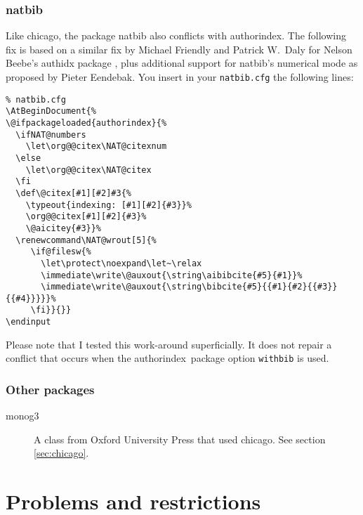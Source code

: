 \documentclass[a4paper]{article}
\newcommand{\package}[1]{\textsf{#1}}
\newcommand{\authorindex}{\package{authorindex}}
\newcommand{\file}[1]{\texttt{#1}}
\newcommand{\ltxinp}[1]{\texttt{\string#1}}
\begin{document}
\subsubsection{\package{natbib}}

Like \package{chicago}, the package \package{natbib} also conflicts with
\authorindex.  The following fix is based on a similar fix by Michael Friendly
and Patrick W.\ Daly for Nelson Beebe's \package{authidx} package
\cite{Beebe98}, plus additional support for \package{natbib}'s numerical mode
as proposed by Pieter Eendebak.  You insert in your \file{natbib.cfg} the
following lines:
\begin{verbatim}
% natbib.cfg
\AtBeginDocument{%
\@ifpackageloaded{authorindex}{%
  \ifNAT@numbers
    \let\org@@citex\NAT@citexnum
  \else
    \let\org@@citex\NAT@citex
  \fi
  \def\@citex[#1][#2]#3{%
    \typeout{indexing: [#1][#2]{#3}}%
    \org@@citex[#1][#2]{#3}%
    \@aicitey{#3}}%
  \renewcommand\NAT@wrout[5]{%
     \if@filesw{%
       \let\protect\noexpand\let~\relax
       \immediate\write\@auxout{\string\aibibcite{#5}{#1}}%
       \immediate\write\@auxout{\string\bibcite{#5}{{#1}{#2}{{#3}}{{#4}}}}}%
     \fi}}{}}
\endinput
\end{verbatim}
Please note that I tested this work-around superficially.  It does not repair a
conflict that occurs when the \authorindex\ package option \ltxinp{withbib} is
used.


\subsubsection{Other packages}

\begin{description}
\item[\package{monog3}] A class from Oxford University Press that used
  \package{chicago}.  See section \ref{sec:chicago}.
\end{description}


\section{Problems and restrictions}
\end{document}
